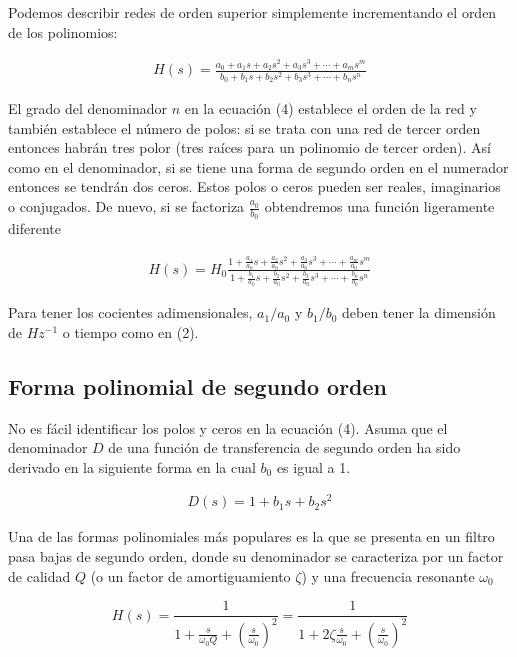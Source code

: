 \documentclass{article}
\begin{document}
Podemos describir redes de orden superior simplemente incrementando el orden de los polinomios:

\begin{align}
	H(s) = \frac{a_0 + a_1s + a_2s^2 + a_3s^3 + \cdots + a_ms^m }{b_0 + b_1s + b_2s^2 + b_3s^3 + \cdots + b_ns^n }
\end{align}

El grado del denominador $n$ en la ecuación (4) establece el orden de la red y también establece el número de polos: si se trata con una red de tercer orden entonces habrán tres polor (tres raíces para un polinomio de tercer orden). Así como en el denominador, si se tiene una forma de segundo orden en el numerador entonces se tendrán dos ceros. Estos polos o ceros pueden ser reales, imaginarios o conjugados. De nuevo, si se factoriza $\frac{a_0}{b_0}$ obtendremos una función ligeramente diferente

\begin{align}
	H(s) = H_0 \frac{1 + \frac{a_1}{a_0}s + \frac{a_2}{a_0}s^2 + \frac{a_3}{a_0}s^3 + \cdots + \frac{a_m}{a_0}s^m }{ 1 + \frac{b_1}{a_0}s + \frac{b_2}{a_0}s^2 + \frac{b_3}{a_0}s^3 + \cdots + \frac{b_n}{b_0}s^n }
\end{align}

Para tener los cocientes adimensionales, $a_1/a_0$ y $b_1/b_0$ deben tener la dimensión de $Hz^{-1}$ o tiempo como en (2).

\subsection{Forma polinomial de segundo orden}
No es fácil identificar los polos y ceros en la ecuación (4). Asuma que el denominador $D$ de una función de transferencia de segundo orden ha sido derivado en la siguiente forma en la cual $b_0$ es igual a 1.

\begin{align}
	D(s) = 1 + b_1s + b_2s^2
\end{align}

Una de las formas polinomiales más populares es la que se presenta en un filtro pasa bajas de segundo orden, donde su denominador se caracteriza por un factor de calidad $Q$ (o un factor de amortiguamiento $\zeta$) y una frecuencia resonante $\omega_0$

\begin{tcolorbox}[colback=red!5!white,colframe=red!75!black,arc=0mm,boxrule=0mm,width=(\linewidth+0.5cm)]
	\begin{equation}
		H(s) = \frac{1}{1 + \frac{s}{\omega_0 Q} + \left( \frac{s}{\omega_0} \right)^2 } = \frac{1}{1 + 2\zeta \frac{s}{\omega_0} + \left( \frac{s}{\omega_0} \right)^2 }
	\end{equation}
\end{tcolorbox}
\end{document}

